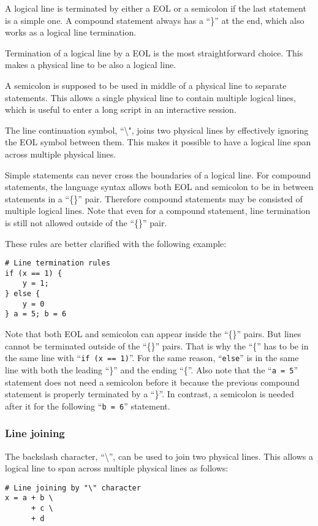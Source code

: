 \documentclass[10pt,a4paper]{article}
\begin{document}
A logical line is terminated by either a EOL or a semicolon if the last
statement is a simple one. A compound statement always has a ``\}'' at 
the end, which also works as a logical line termination.

Termination of a logical line by a EOL is the most straightforward choice. 
This makes a physical line to be also a logical line.

A semicolon is supposed to be used in middle of a physical line to separate 
statements. This allows a single physical line to contain multiple logical
lines, which is useful to enter a long script in an interactive session.

The line continuation symbol, ``\textbackslash", joins two physical lines
by effectively ignoring the EOL symbol between them.
This makes it possible to have a logical line span across multiple 
physical lines. 

Simple statements can never cross the boundaries of a logical line.
For compound statements, the language syntax allows both EOL and semicolon
to be in between statements in a ``\{\}'' pair. Therefore compound statements
may be consisted of multiple logical lines. Note that even for a compound 
statement, line termination is still not allowed outside of the 
``\{\}'' pair. 

These rules are better clarified with the following example:

\begin{lstlisting}
# Line termination rules
if (x == 1) {
    y = 1;
} else {
    y = 0
} a = 5; b = 6
\end{lstlisting}

Note that both EOL and semicolon can appear inside the ``\{\}'' pairs. 
But lines cannot be terminated outside of the ``\{\}'' pairs. That is
why the ``\{'' has to be in the same line with ``\lstinline$if (x == 1)$''.
For the same reason, ``\lstinline$else$'' is in the same line with both 
the leading
``\}'' and the ending ``\{''. Also note that the ``\lstinline$a = 5$'' 
statement does
not need a semicolon before it because the previous compound statement
is properly terminated by a ``\}''. In contrast, a semicolon is needed
after it for the following ``\lstinline$b = 6$'' statement.

\subsubsection{Line joining}
The backslash character, ``\textbackslash'', can be used to join two 
physical lines.
This allows a logical line to span across multiple physical lines as follows:
\begin{lstlisting}
# Line joining by "\" character
x = a + b \
      + c \
      + d
\end{lstlisting}
\end{document}
